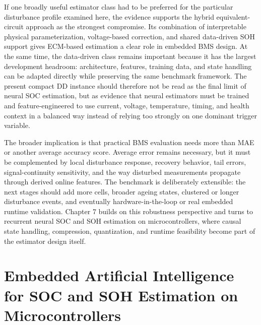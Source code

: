 \documentclass[
    a4paper,
    12pt,
    titlepage,
    bibliography=totoc,
    twoside=on,
    parskip=false,
    numbers=noenddot,
    cleardoublepage=empty,
    DIV=12,
    BCOR=12.0mm,
    headheight=36pt,
    headings=openright
]{scrreprt}
\begin{document}
If one broadly useful estimator class had to be preferred for the particular disturbance profile examined here, the evidence supports the hybrid equivalent-circuit approach as the strongest compromise. Its combination of interpretable physical parameterization, voltage-based correction, and shared data-driven SOH support gives ECM-based estimation a clear role in embedded BMS design. At the same time, the data-driven class remains important because it has the largest development headroom: architecture, features, training data, and state handling can be adapted directly while preserving the same benchmark framework. The present compact DD instance should therefore not be read as the final limit of neural SOC estimation, but as evidence that neural estimators must be trained and feature-engineered to use current, voltage, temperature, timing, and health context in a balanced way instead of relying too strongly on one dominant trigger variable.

The broader implication is that practical BMS evaluation needs more than MAE or another average accuracy score. Average error remains necessary, but it must be complemented by local disturbance response, recovery behavior, tail errors, signal-continuity sensitivity, and the way disturbed measurements propagate through derived online features. The benchmark is deliberately extensible: the next stages should add more cells, broader ageing states, clustered or longer disturbance events, and eventually hardware-in-the-loop or real embedded runtime validation. Chapter 7 builds on this robustness perspective and turns to recurrent neural SOC and SOH estimation on microcontrollers, where causal state handling, compression, quantization, and runtime feasibility become part of the estimator design itself.

\chapter{Embedded Artificial Intelligence for SOC and SOH Estimation on Microcontrollers}
\end{document}
